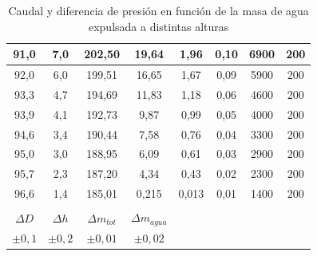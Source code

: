 \documentclass[a4paper,12pt,spanish]{article}
\begin{document}
\begin{table}[H]
\begin{tabular}{cccccccc}
			\multicolumn{1}{|c|}{91,0} & \multicolumn{1}{c|}{7,0} & \multicolumn{1}{c|}{202,50} & \multicolumn{1}{c|}{19,64} & \multicolumn{1}{c|}{1,96} & \multicolumn{1}{c|}{0,10} & \multicolumn{1}{c|}{6900} & \multicolumn{1}{c|}{200} \\ \hline
			\multicolumn{1}{|c|}{92,0} & \multicolumn{1}{c|}{6,0} & \multicolumn{1}{c|}{199,51} & \multicolumn{1}{c|}{16,65} & \multicolumn{1}{c|}{1,67} & \multicolumn{1}{c|}{0,09} & \multicolumn{1}{c|}{5900} & \multicolumn{1}{c|}{200} \\ \hline
			\multicolumn{1}{|c|}{93,3} & \multicolumn{1}{c|}{4,7} & \multicolumn{1}{c|}{194,69} & \multicolumn{1}{c|}{11,83} & \multicolumn{1}{c|}{1,18} & \multicolumn{1}{c|}{0,06} & \multicolumn{1}{c|}{4600} & \multicolumn{1}{c|}{200} \\ \hline
			\multicolumn{1}{|c|}{93,9} & \multicolumn{1}{c|}{4,1} & \multicolumn{1}{c|}{192,73} & \multicolumn{1}{c|}{9,87} & \multicolumn{1}{c|}{0,99} & \multicolumn{1}{c|}{0,05} & \multicolumn{1}{c|}{4000} & \multicolumn{1}{c|}{200} \\ \hline
			\multicolumn{1}{|c|}{94,6} & \multicolumn{1}{c|}{3,4} & \multicolumn{1}{c|}{190,44} & \multicolumn{1}{c|}{7,58} & \multicolumn{1}{c|}{0,76} & \multicolumn{1}{c|}{0,04} & \multicolumn{1}{c|}{3300} & \multicolumn{1}{c|}{200} \\ \hline
			\multicolumn{1}{|c|}{95,0} & \multicolumn{1}{c|}{3,0} & \multicolumn{1}{c|}{188,95} & \multicolumn{1}{c|}{6,09} & \multicolumn{1}{c|}{0,61} & \multicolumn{1}{c|}{0,03} & \multicolumn{1}{c|}{2900} & \multicolumn{1}{c|}{200} \\ \hline
			\multicolumn{1}{|c|}{95,7} & \multicolumn{1}{c|}{2,3} & \multicolumn{1}{c|}{187,20} & \multicolumn{1}{c|}{4,34} & \multicolumn{1}{c|}{0,43} & \multicolumn{1}{c|}{0,02} & \multicolumn{1}{c|}{2300} & \multicolumn{1}{c|}{200} \\ \hline
			\multicolumn{1}{|c|}{96,6} & \multicolumn{1}{c|}{1,4} & \multicolumn{1}{c|}{185,01} & \multicolumn{1}{c|}{0,215} & \multicolumn{1}{c|}{0,013} & \multicolumn{1}{c|}{0,01} & \multicolumn{1}{c|}{1400} & \multicolumn{1}{c|}{200} \\ \hline
			\multicolumn{1}{l}{} & \multicolumn{1}{l}{} & \multicolumn{1}{l}{} & \multicolumn{1}{l}{} & \multicolumn{1}{l}{} & \multicolumn{1}{l}{} & \multicolumn{1}{l}{} & \multicolumn{1}{l}{} \\ \cline{1-4}
			\multicolumn{1}{|c|}{$\Delta D   $} & \multicolumn{1}{c|}{$\Delta h  $} & \multicolumn{1}{c|}{$\Delta m_{tot}  $} & \multicolumn{1}{c|}{$\Delta m_{agua} $} &  &  &  &  \\ \cline{1-4}
			\multicolumn{1}{|c|}{$\pm 0,1$} & \multicolumn{1}{c|}{$\pm0,2$} & \multicolumn{1}{c|}{$\pm0,01$} & \multicolumn{1}{c|}{$\pm0,02$} &  &  &  &  \\ \cline{1-4}
		\end{tabular}
		\caption{Caudal y diferencia de presión en función de la masa de agua expulsada a distintas alturas}
	\end{table}
	
\end{document}
